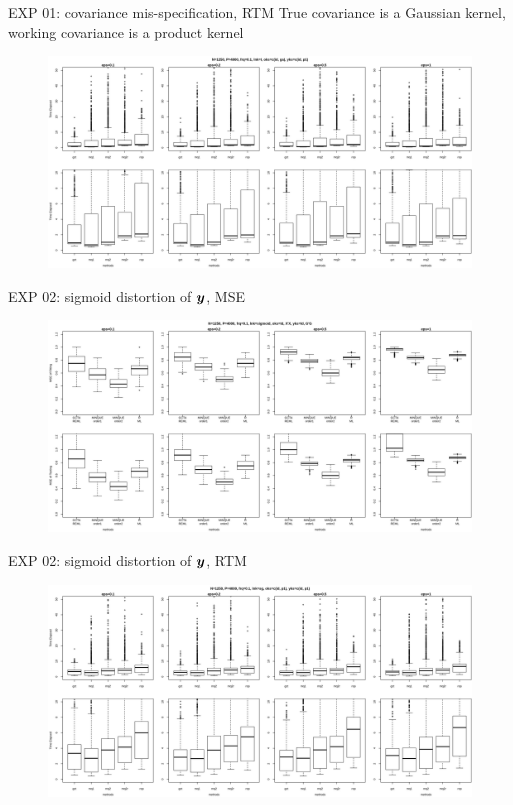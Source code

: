 \documentclass{beamer}
\begin{document}
\begin{frame}{EXP 01: covariance mis-specification, RTM}
  \scriptsize{True covariance is a Gaussian kernel, working covariance is a product kernel}
  \normalsize
  \begin{figure}
    \includegraphics[width=1.00\linewidth]{t01_bxp.png}
  \end{figure}
\end{frame}
\begin{frame}{EXP 02: sigmoid distortion of $\boldsymbol{y}$, MSE}
  \begin{figure}\includegraphics[width=1.00\linewidth]{s02_bxp.png}\end{figure}
\end{frame}
\begin{frame}{EXP 02: sigmoid distortion of $\boldsymbol{y}$, RTM}
  \begin{figure}\includegraphics[width=1.00\linewidth]{t02_bxp.png}\end{figure}
\end{frame}
\end{document}
